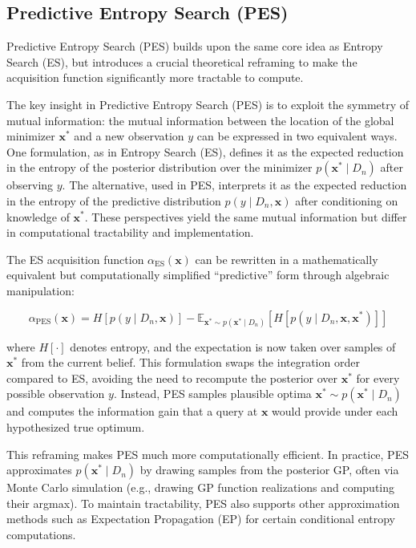 \documentclass{ut-thesis}
\begin{document}
\subsection{Predictive Entropy Search (PES)}

Predictive Entropy Search (PES) builds upon the same core idea as Entropy Search (ES), but introduces a crucial theoretical reframing to make the acquisition function significantly more tractable to compute\cite{hernandez2014predictive}. 

The key insight in Predictive Entropy Search (PES) is to exploit the symmetry of mutual information: the mutual information between the location of the global minimizer \( \mathbf{x}^* \) and a new observation \( y \) can be expressed in two equivalent ways. One formulation, as in Entropy Search (ES), defines it as the expected reduction in the entropy of the posterior distribution over the minimizer \( p(\mathbf{x}^* \mid D_n) \) after observing \( y \). The alternative, used in PES, interprets it as the expected reduction in the entropy of the predictive distribution \( p(y \mid D_n, \mathbf{x}) \) after conditioning on knowledge of \( \mathbf{x}^* \). These perspectives yield the same mutual information but differ in computational tractability and implementation.

The ES acquisition function \( \alpha_{\text{ES}}(\mathbf{x}) \) can be rewritten in a mathematically equivalent but computationally simplified “predictive” form through algebraic manipulation:

\begin{equation}
    \alpha_{\text{PES}}(\mathbf{x}) = H[p(y \mid D_n, \mathbf{x})] - \mathbb{E}_{\mathbf{x}^* \sim p(\mathbf{x}^* \mid D_n)} \left[ H[p(y \mid D_n, \mathbf{x}, \mathbf{x}^*)] \right]
\end{equation}

where \( H[\cdot] \) denotes entropy, and the expectation is now taken over samples of \( \mathbf{x}^* \) from the current belief. This formulation swaps the integration order compared to ES, avoiding the need to recompute the posterior over \( \mathbf{x}^* \) for every possible observation \( y \). Instead, PES samples plausible optima \( \mathbf{x}^* \sim p(\mathbf{x}^* \mid D_n) \) and computes the information gain that a query at \( \mathbf{x} \) would provide under each hypothesized true optimum.

This reframing makes PES much more computationally efficient. In practice, PES approximates \( p(\mathbf{x}^* \mid D_n) \) by drawing samples from the posterior GP, often via Monte Carlo simulation (e.g., drawing GP function realizations and computing their argmax). To maintain tractability, PES also supports other approximation methods such as Expectation Propagation (EP) for certain conditional entropy computations.
\end{document}
